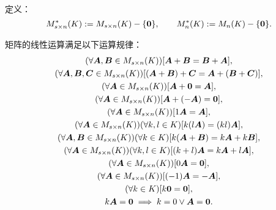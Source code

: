 定义：\begin{equation*}
	M_{s \times n}^*(K) := M_{s \times n}(K)-\{\boldsymbol0\},
	\qquad
	M_n^*(K) := M_n(K)-\{\boldsymbol0\}.
\end{equation*}

\begin{theorem}
矩阵的线性运算满足以下运算规律：
\begin{gather}
	(\forall\boldsymbol{A},\boldsymbol{B}\in M_{s\times n}(K))[\boldsymbol{A} + \boldsymbol{B} = \boldsymbol{B} + \boldsymbol{A}], \\
	(\forall\boldsymbol{A},\boldsymbol{B},\boldsymbol{C}\in M_{s\times n}(K))[(\boldsymbol{A} + \boldsymbol{B}) + \boldsymbol{C} = \boldsymbol{A} + (\boldsymbol{B} + \boldsymbol{C})], \\
	(\forall\boldsymbol{A} \in M_{s\times n}(K))[\boldsymbol{A} + \boldsymbol0 = \boldsymbol{A}], \\
	(\forall\boldsymbol{A} \in M_{s\times n}(K))[\boldsymbol{A} + (-\boldsymbol{A}) = \boldsymbol0], \\
	(\forall\boldsymbol{A} \in M_{s\times n}(K))[1 \boldsymbol{A} = \boldsymbol{A}], \\
	(\forall\boldsymbol{A} \in M_{s\times n}(K))(\forall k,l\in K)[k(l \boldsymbol{A}) = (kl) \boldsymbol{A}], \\
	(\forall\boldsymbol{A},\boldsymbol{B}\in M_{s\times n}(K))(\forall k\in K)[k(\boldsymbol{A} + \boldsymbol{B}) = k\boldsymbol{A} + k\boldsymbol{B}], \\
	(\forall\boldsymbol{A} \in M_{s\times n}(K))(\forall k,l\in K)[(k+l)\boldsymbol{A} = k\boldsymbol{A} + l\boldsymbol{A}], \\
	(\forall\boldsymbol{A} \in M_{s\times n}(K))[0\boldsymbol{A} = \boldsymbol0], \\
	(\forall\boldsymbol{A} \in M_{s\times n}(K))[(-1)\boldsymbol{A} = -\boldsymbol{A}], \\
	(\forall k\in K)[k\boldsymbol0 = \boldsymbol0], \\
	k\boldsymbol{A} = \boldsymbol0 \implies k = 0 \lor \boldsymbol{A} = \boldsymbol0.
\end{gather}
\end{theorem}
